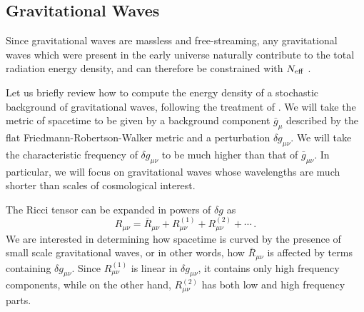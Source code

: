 \subsection{Gravitational Waves}\label{sec:constraintsntNeff}

Since gravitational waves are massless and free-streaming, any gravitational waves which were present in the early universe naturally contribute to the total radiation energy density, and can therefore be constrained with $N_{\rm eff}$ \cite{Boyle:2003km,Boyle:2007zx,Stewart:2007fu,Meerburg:2015zua,Lasky:2015lej}.

Let us briefly review how to compute the energy density of a stochastic background of gravitational waves, following the treatment of \cite{Isaacson:1968zza,Misner:1974qy,Watanabe:2006qe,Maggiore:1900zz}.  We will take the metric of spacetime to be given by a background component $\bar{g}_{\mu}$ described by the flat Friedmann-Robertson-Walker metric and a perturbation $\delta g_{\mu\nu}$.  We will take the characteristic frequency of $\delta g_{\mu\nu}$ to be much higher than that of $\bar{g}_{\mu\nu}$.  In particular, we will focus on gravitational waves whose wavelengths are much shorter than scales of cosmological interest.

The Ricci tensor can be expanded in powers of $\delta g$ as
\begin{equation}\label{eq:Ricci_GW}
	R_{\mu\nu} = \bar{R}_{\mu\nu} + R_{\mu\nu}^{(1)} + R_{\mu\nu}^{(2)} + \cdots \, .
\end{equation}
We are interested in determining how spacetime is curved by the presence of small scale gravitational waves, or in other words, how $\bar{R}_{\mu\nu}$ is affected by terms containing $\delta g_{\mu\nu}$.  Since $R_{\mu\nu}^{(1)}$ is linear in $\delta g_{\mu\nu}$, it contains only high frequency components, while on the other hand, $R_{\mu\nu}^{(2)}$ has both low and high frequency parts.  

